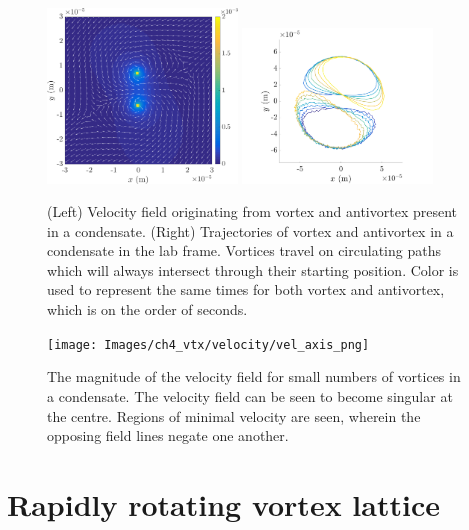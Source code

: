 \begin{figure}\centering
    \includegraphics[width=0.45\textwidth]{Images/ch4_vtx/vtx_anti_velfield}
    \includegraphics[width=0.45\textwidth]{Images/ch4_vtx/vtx_antivtx_traj}
    \caption{(Left) Velocity field originating from vortex and antivortex present in a condensate. (Right) Trajectories of vortex and antivortex in a condensate in the lab frame. Vortices travel on circulating paths which will always intersect through their starting position. Color is used to represent the same times for both vortex and antivortex, which is on the order of seconds.}
    \label{fig:vel_pm}
\end{figure}

\begin{figure}\centering
    \texttt{[image: Images/ch4\_vtx/velocity/vel\_axis\_png]}
    \caption{The magnitude of the velocity field for small numbers of vortices in a condensate. The velocity field can be seen to become singular at the centre. Regions of minimal velocity are seen, wherein the opposing field lines negate one another.}
    \label{fig:vel_pm_contour}
\end{figure}


\section{Rapidly rotating vortex lattice}

